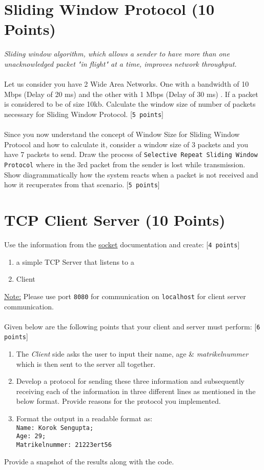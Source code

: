 \documentclass{WeSTassignment}
\begin{document}
\section{Sliding Window Protocol (10 Points)}
\emph{Sliding window algorithm, which allows a sender to have more than one unacknowledged packet "in flight" at a time, improves network throughput. }\\ \\
Let us consider you have 2 Wide Area Networks. One with a bandwidth of 10 Mbps (Delay of 20 ms) and the other with 1 Mbps (Delay of 30 ms) . If a packet is considered to be of size 10kb. Calculate the window size of number of packets necessary for Sliding Window Protocol. [\texttt{5 points}]\\ \\
Since you now understand the concept of Window Size for Sliding Window Protocol and how to calculate it, consider a window size of 3 packets and you have 7 packets to send. Draw the process of \texttt{Selective Repeat Sliding Window Protocol} where in the 3rd packet from the sender is lost while transmission. Show diagrammatically how the system reacts when a packet is not received and how it recuperates from that scenario. [\texttt{5 points}] \\





\section{TCP Client Server (10 Points)}

Use the information from the \href{https://docs.python.org/3/howto/sockets.html}{socket} documentation and create: [\texttt{4 points}]
\begin{enumerate}
\item a simple TCP Server that listens to a
\item Client
\end{enumerate}
\underline{Note:} Please use port \texttt{8080} for communication on \texttt{localhost} for client server communication.\\ \\
Given below are the following points that your client and server must perform: [\texttt{6 points}]
\begin{enumerate}
\item The \emph{Client} side asks the user to input their name, age \& \emph{matrikelnummer} which is then sent to the server all together.
\item Develop a protocol for sending these three information and subsequently receiving each of the information in three different lines as mentioned in the below format. Provide reasons for the protocol you implemented. 
\item Format the output in a readable format as:\texttt{\\ Name: Korok Sengupta; \\ Age: 29; \\ Matrikelnummer: 21223ert56}
\end{enumerate}

Provide a snapshot of the results along with the code. \\





\makefooter
\end{document}
